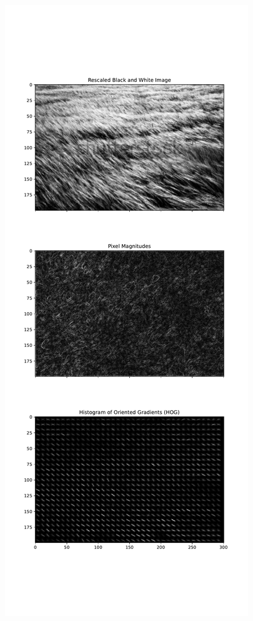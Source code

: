 \documentclass[
  letterpaper,
]{report}
\begin{document}
\begin{figure}[H]

{\centering \includegraphics{results_files/figure-pdf/unnamed-chunk-32-2.pdf}

}

\end{figure}
\end{document}
